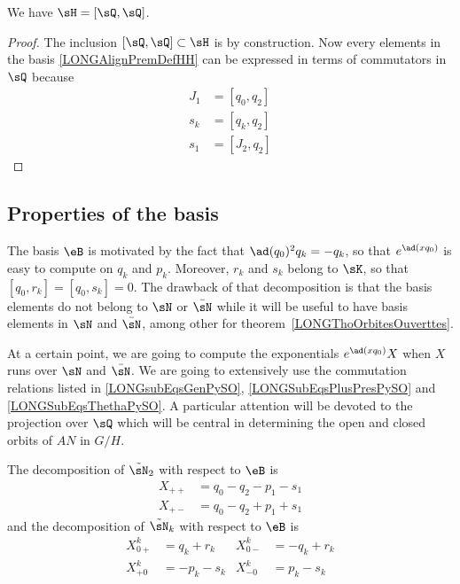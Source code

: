 \begin{proposition}
	We have $\sH=[\sQ,\sQ]$.
\end{proposition}

\begin{proof}
	The inclusion $[\sQ,\sQ]\subset\sH$ is by construction. Now every elements in the basis \eqref{LONGAlignPremDefHH} can be expressed in terms of commutators in $\sQ$ because
	\begin{subequations}
		\begin{align}
			J_1&=[q_0,q_2]\\
			s_k&=[q_k,q_2]\\
			s_1&=[J_2,q_2]	\label{LONGEqJdqdsu}
		\end{align}
	\end{subequations}
\end{proof}

%
\subsection{Properties of the basis}
%


The basis $\eB$ is motivated by the fact that $\ad(q_0)^2q_k=-q_k$, so that $ e^{\ad(xq_0)}$ is easy to compute on $q_k$ and $p_k$. Moreover, $r_k$ and $s_k$ belong to $\sK$, so that $[q_0,r_k]=[q_0,s_k]=0$. The drawback of that decomposition is that the basis elements do not belong to $\sN$ or $\bar\sN$ while it will be useful to have basis elements in $\sN$ and $\bar\sN$, among other for theorem~\ref{LONGThoOrbitesOuverttes}.

At a certain point, we are going to compute the exponentials $ e^{\ad(xq_0)}X$ when $X$ runs over $\sN$ and $\bar\sN$. We are going to extensively use the commutation relations listed in \eqref{LONGsubEqsGenPySO}, \eqref{LONGSubEqsPlusPresPySO} and \eqref{LONGSubEqsThethaPySO}. A particular attention will be devoted to the projection over $\sQ$ which will be central in determining the open and closed orbits of $AN$ in $G/H$.

\begin{lemma}		\label{LONGLemDecomptsNDanseB}
	The decomposition of $\tilde\sN_2$ with respect to $\eB$ is
	\begin{subequations}		\label{LONGSubeqsDecompXqps}
		\begin{align}
			X_{++}&=q_0-q_2-p_1-s_1\\
			X_{+-}&=q_0-q_2+p_1+s_1
		\end{align}
	\end{subequations}
	and the decomposition of $\tilde\sN_k$ with respect to $\eB$ is
	\begin{subequations}
		\begin{align}
			X_{0+}^k & = q_k+r_k	&    X_{0-}^k&=-q_k+r_k		\label{LONGsubEqqrkXzpegal}	\\
			X_{+0}^k & = -p_k-s_k	&	X_{-0}^k & = p_k-s_k
		\end{align}
	\end{subequations}

\end{lemma}

